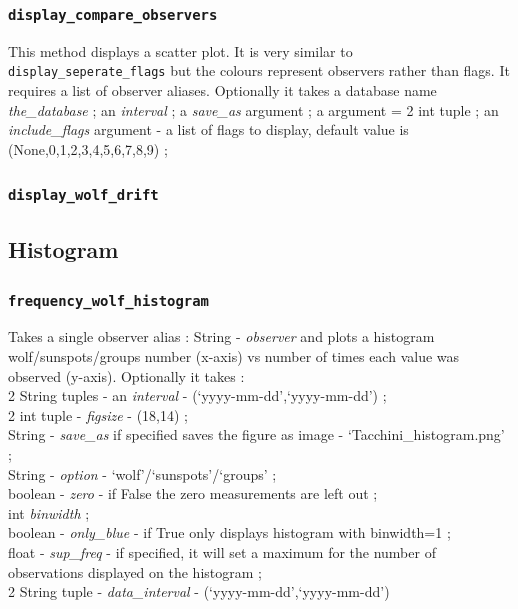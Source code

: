 \documentclass[12pt]{article}
\begin{document}
\subsubsection{\texttt{display\_compare\_observers}}
This method displays a scatter plot. It is very similar to \texttt{display\_seperate\_flags} but the colours represent observers rather than flags. It requires a list of observer aliases. Optionally it takes a database name \textit{the\_database} ; an \textit{interval} ; a \textit{save\_as} argument ; a  argument = 2 int tuple ; an \textit{include\_flags} argument - a list of flags to display, default value is (None,0,1,2,3,4,5,6,7,8,9) ; 

\subsubsection{\texttt{display\_wolf\_drift}}



\subsection{Histogram}
\subsubsection{\texttt{frequency\_wolf\_histogram}}
Takes a single observer alias : String - \textit{observer} and plots a histogram wolf/sunspots/groups number (x-axis) vs number of times each value was observed (y-axis). Optionally it takes : \\
2 String tuples - an \textit{interval} - (`yyyy-mm-dd',`yyyy-mm-dd') ;\\
2 int tuple - \textit{figsize} - (18,14) ; \\
String - \textit{save\_as} if specified saves the figure as image - `Tacchini\_histogram.png' ; \\
String - \textit{option} - `wolf'/`sunspots'/`groups' ; \\
boolean - \textit{zero} - if False the zero measurements are left out ; \\
int \textit{binwidth} ; \\
boolean - \textit{only\_blue} - if True only displays histogram with binwidth=1 ; \\
float - \textit{sup\_freq} - if specified, it will set a maximum for the number of observations displayed on the histogram ;\\
2 String tuple - \textit{data\_interval} - (`yyyy-mm-dd',`yyyy-mm-dd')
\end{document}
